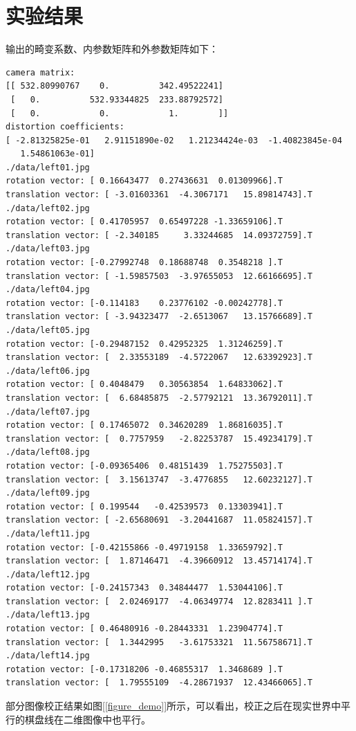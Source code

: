 \documentclass[a4paper, 12pt, UTF8]{article}
\begin{document}
\section{实验结果}

输出的畸变系数、内参数矩阵和外参数矩阵如下：

\begin{lstlisting}
camera matrix:
[[ 532.80990767    0.          342.49522241]
 [   0.          532.93344825  233.88792572]
 [   0.            0.            1.        ]]
distortion coefficients:
[ -2.81325825e-01   2.91151890e-02   1.21234424e-03  -1.40823845e-04
   1.54861063e-01]
./data/left01.jpg
rotation vector: [ 0.16643477  0.27436631  0.01309966].T
translation vector: [ -3.01603361  -4.3067171   15.89814743].T
./data/left02.jpg
rotation vector: [ 0.41705957  0.65497228 -1.33659106].T
translation vector: [ -2.340185     3.33244685  14.09372759].T
./data/left03.jpg
rotation vector: [-0.27992748  0.18688748  0.3548218 ].T
translation vector: [ -1.59857503  -3.97655053  12.66166695].T
./data/left04.jpg
rotation vector: [-0.114183    0.23776102 -0.00242778].T
translation vector: [ -3.94323477  -2.6513067   13.15766689].T
./data/left05.jpg
rotation vector: [-0.29487152  0.42952325  1.31246259].T
translation vector: [  2.33553189  -4.5722067   12.63392923].T
./data/left06.jpg
rotation vector: [ 0.4048479   0.30563854  1.64833062].T
translation vector: [  6.68485875  -2.57792121  13.36792011].T
./data/left07.jpg
rotation vector: [ 0.17465072  0.34620289  1.86816035].T
translation vector: [  0.7757959   -2.82253787  15.49234179].T
./data/left08.jpg
rotation vector: [-0.09365406  0.48151439  1.75275503].T
translation vector: [  3.15613747  -3.4776855   12.60232127].T
./data/left09.jpg
rotation vector: [ 0.199544   -0.42539573  0.13303941].T
translation vector: [ -2.65680691  -3.20441687  11.05824157].T
./data/left11.jpg
rotation vector: [-0.42155866 -0.49719158  1.33659792].T
translation vector: [  1.87146471  -4.39660912  13.45714174].T
./data/left12.jpg
rotation vector: [-0.24157343  0.34844477  1.53044106].T
translation vector: [  2.02469177  -4.06349774  12.8283411 ].T
./data/left13.jpg
rotation vector: [ 0.46480916 -0.28443331  1.23904774].T
translation vector: [  1.3442995   -3.61753321  11.56758671].T
./data/left14.jpg
rotation vector: [-0.17318206 -0.46855317  1.3468689 ].T
translation vector: [  1.79555109  -4.28671937  12.43466065].T
\end{lstlisting}

部分图像校正结果如图[\ref{figure_demo}]所示，可以看出，校正之后在现实世界中平行的棋盘线在二维图像中也平行。
\end{document}
